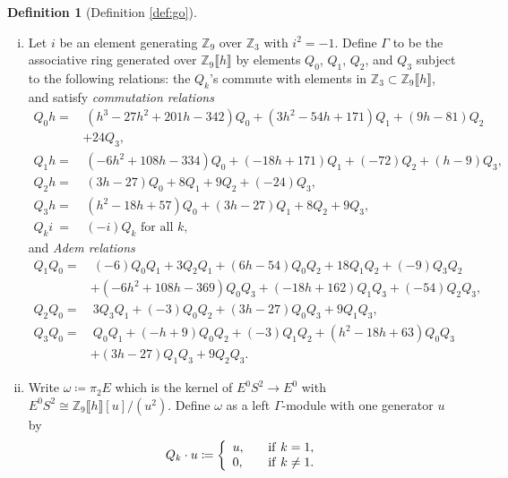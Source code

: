 \documentclass{gtpart}
\theoremstyle{definition}
\newtheorem{defn}[thm]{Definition}
\theoremstyle{remark}
\newcommand{\mb}[1]{\mathbb{#1}}
\newcommand{\BZ}{{\mb Z}}
\newcommand{\G}{\Gamma}
\newcommand{\ce}{\coloneqq}
\numberwithin{equation}{section}
\numberwithin{thm}{section}
\begin{document}
\begin{defn}[Definition \ref{def:go}]
\label{def}
 \mbox{}
 \begin{enumerate}[(i)]
  \item \label{gamma} Let $i$ be an element generating $\BZ_9$ over 
  $\BZ_3$ with $i^2 = -1$.  Define $\G$ to be the associative ring 
  generated over $\BZ_9 \llbracket h \rrbracket$ by elements $Q_0$, 
  $Q_1$, $Q_2$, and $Q_3$ subject to the following relations: the 
  $Q_k$'s commute with elements in 
  $\BZ_3 \subset \BZ_9 \llbracket h \rrbracket$, and satisfy 
  {\em commutation relations} 
  \begin{equation*}
  \begin{split}
   Q_0 h = & ~ (h^3 - 27 h^2 + 201 h - 342) Q_0 + (3 h^2 - 54 h + 171) Q_1 + (9 h - 81) Q_2 \\
           & + 24 Q_3, \\
   Q_1 h = & ~ (-6 h^2 + 108 h - 334) Q_0 + (-18 h + 171) Q_1 + (-72) Q_2 + (h - 9) Q_3, \\
   Q_2 h = & ~ (3 h - 27) Q_0 + 8 Q_1 + 9 Q_2 + (-24) Q_3, \\
   Q_3 h = & ~ (h^2 - 18 h + 57) Q_0 + (3 h - 27) Q_1 + 8 Q_2 + 9 Q_3, \\
   Q_k i ~ = & ~ (-i) Q_k \text{~for all~} k, 
  \end{split}
  \end{equation*}
  and {\em Adem relations} 
  \begin{equation*}
  \begin{split}
   Q_1Q_0 = & ~ (-6) Q_0Q_1 + 3 Q_2Q_1 + (6 h - 54) Q_0Q_2 + 18 Q_1Q_2 + (-9) Q_3Q_2 \\
            & + (-6 h^2 + 108 h - 369) Q_0Q_3 + (-18 h + 162) Q_1Q_3 + (-54) Q_2Q_3, ~ \\
   Q_2Q_0 = & ~ 3 Q_3Q_1 + (-3) Q_0Q_2 + (3 h - 27) Q_0Q_3 + 9 Q_1Q_3, \\
   Q_3Q_0 = & ~ Q_0Q_1 + (-h + 9) Q_0Q_2 + (-3) Q_1Q_2 + (h^2 - 18 h + 63) Q_0Q_3 \\
            & + (3 h - 27) Q_1Q_3 + 9 Q_2Q_3.  
  \end{split}
  \end{equation*}

  \item \label{omega} Write $\omega \coloneqq \pi_2 E$ which is the 
  kernel of $E^0 S^2 \to E^0$ with 
  $E^0 S^2 \cong \BZ_9 \llbracket h \rrbracket [u] / (u^2)$.  Define 
  $\omega$ as a left $\G$-module with one generator $u$ by 
  \[
   Q_k \cdot u \ce \left\{
   \begin{array}{ll}
     u,  & \quad {\rm if}~k = 1, \\
     0,  & \quad {\rm if}~k \neq 1.  
   \end{array}
   \right.
  \]
 \end{enumerate}
\end{defn}
\end{document}
